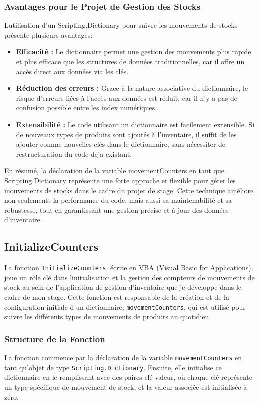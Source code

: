 \documentclass[a4paper, oneside, 12pt, final]{extreport}
\begin{document}
\subsubsection{Avantages pour le Projet de Gestion des Stocks}
Lutilisation d'un Scripting.Dictionary pour suivre les mouvements de stocks présente plusieurs avantages:
\begin{itemize}


\item \textbf{Efficacité :} Le dictionnaire permet une gestion des mouvements plus rapide et plus efficace que les structures de données traditionnelles, car il offre un accès direct aux données via les clés.

\item \textbf{Réduction des erreurs :} Grace à la nature associative du dictionnaire, le risque d'erreurs liées à l'accès aux données est réduit; car il n'y a pas de confusion possible entre les index numériques.

\item \textbf{Extensibilité :} Le code utilisant un dictionnaire est facilement extensible. Si de nouveaux types de produits sont ajoutés à l'inventaire, il suffit de les ajouter comme nouvelles clés dans le dictionnaire, sans nécessiter de restructuration du code deja existant.
\end{itemize}

En résumé, la déclaration de la variable movementCounters en tant que Scripting.Dictionary représente une forte approche et flexible pour gérer les mouvements de stocks dans le cadre du projet de stage. Cette technique améliore non seulementt la performance du code, mais aussi sa maintenabilité et sa robustesse, tout en garantissant une gestion précise et à jour des données d'inventaire.
\subsection{InitializeCounters}
La fonction \texttt{InitializeCounters}, écrite en VBA (Visual Basic for Applications), joue un rôle clé dans linitialisation et la gestion des compteurs de mouvements de stock au sein de l'application de gestion d'inventaire que je développe dans le cadre de mon stage. Cette fonction est responsable de la création et de la configuration initiale d'un dictionnaire, \texttt{movementCounters}, qui est utilisé pour suivre les différents types de mouvements de produits au quotidien.

\subsubsection{Structure de la Fonction}
La fonction commence par la déclaration de la variable \texttt{movementCounters} en tant qu'objet de type \texttt{Scripting.Dictionary}. Ensuite, elle initialise ce dictionnaire en le remplissant avec des paires clé-valeur, où chaque clé représente un type spécifique de mouvement de stock, et la valeur associée est initialisée à zéro.
\end{document}
